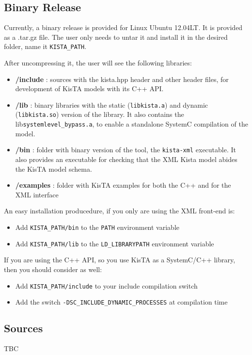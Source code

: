 \subsection{Binary Release}
\label{sec:install_bin}

Currently, a binary release is provided for Linux Ubuntu 12.04LT.
It is provided as a .tar.gz file. The user only needs to untar it
and install it in the desired folder, name it \texttt{KISTA\_PATH}.

After uncompressing it, the user will see the following libraries:

\begin{itemize}
\item \textbf{/include} : sources with the kista.hpp header and other header files, for development of KisTA models with its C++ API.
\item \textbf{/lib} : binary libraries with the static (\texttt{libkista.a}) and dynamic (\texttt{libkista.so}) version of the library. It also contains the lib\texttt{systemlevel\_bypass.a}, to enable a standalone SystemC compilation of the model.
\item \textbf{/bin} : folder with binary version of the tool, the \texttt{kista-xml} executable. It also provides an executable for checking that the XML Kista model abides the KisTA model schema.
\item \textbf{/examples} : folder with KisTA examples for both the C++ and for the XML interface
\end{itemize}

An easy installation producedure, if you only are using the XML front-end is:
\begin{itemize}
\item Add \texttt{KISTA\_PATH/bin} to the \texttt{PATH} environment variable
\item Add \texttt{KISTA\_PATH/lib} to the \texttt{LD\_LIBRARYPATH} environment variable
\end{itemize}

If you are using the C++ API, so you use KisTA as a SystemC/C++ library, then you should consider as well:

\begin{itemize}
\item Add \texttt{KISTA\_PATH/include} to your include compilation switch
\item Add the switch \texttt{-DSC\_INCLUDE\_DYNAMIC\_PROCESSES} at compilation time
\end{itemize}

\subsection{Sources}
\label{sec:install_bin}

TBC